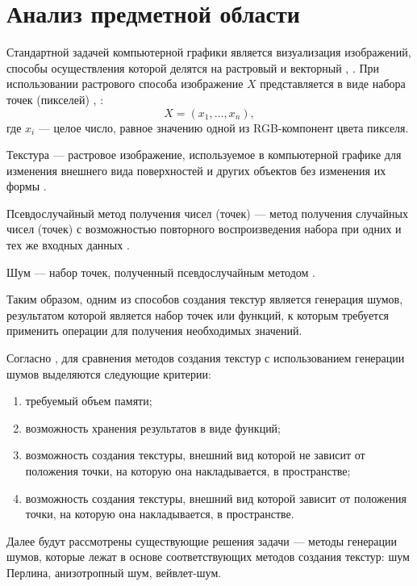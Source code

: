 \chapter{Анализ предметной области}


Стандартной задачей компьютерной графики является визуализация изображений, способы осуществления которой делятся на растровый и векторный \cite{Porev}, \cite{boreskov}.
При использовании растрового способа изображение $X$ представляется в виде набора точек (пикселей) \cite{Porev}, \cite{boreskov}:
\begin{equation}\label{eq:image_x}
	X=(x_1,\dots,x_n),
\end{equation}
где $x_i$ --- целое число, равное значению одной из RGB-компонент цвета пикселя.

Текстура --- растровое изображение, используемое в компьютерной графике для изменения внешнего вида поверхностей и других объектов без изменения их формы \cite{smorkalov}.

Псевдослучайный метод получения чисел (точек) --- метод получения случайных чисел (точек) с возможностью повторного воспроизведения набора при одних и тех же входных данных \cite{мухамеджанов2018генератор}.

Шум --- набор точек, полученный псевдослучайным методом \cite{petrova2022}.

Таким образом, одним из способов создания текстур является генерация шумов, результатом которой является набор точек или функций, к которым требуется применить операции для получения необходимых значений.

Согласно \cite{survey}, для сравнения методов создания текстур с использованием генерации шумов выделяются следующие критерии:
\begin{enumerate}
	\item требуемый объем памяти;
	\item возможность хранения результатов в виде функций;
	\item возможность создания текстуры, внешний вид которой не зависит от положения точки, на которую она накладывается, в пространстве;
	\item возможность создания текстуры, внешний вид которой зависит от положения точки, на которую она накладывается, в пространстве.
\end{enumerate}

Далее будут рассмотрены существующие решения задачи --- методы генерации шумов, которые лежат в основе соответствующих методов создания текстур: шум Перлина, анизотропный шум, вейвлет-шум.